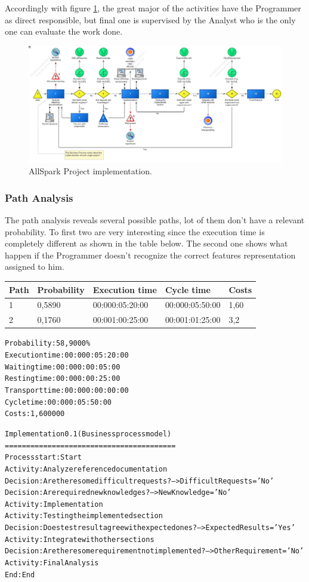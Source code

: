 Accordingly with figure \ref{2img:implementation}, the great major of the activities have the Programmer as direct responsible, but final one is supervised by the Analyst who is the only one can evaluate the work done.

\begin{figure}[ht!]
\begin{centering}
\includegraphics[scale=0.35, angle=90]{assign2/adonis/imgs/implementation.jpg}
\caption{AllSpark Project implementation.}
\label{2img:implementation}
\end{centering}
\end{figure}


\subsubsection{Path Analysis}
The path analysis reveals several possible paths, lot of them don't have a relevant probability. To first two are very interesting since the execution time is completely different as shown in the table below. The second one shows what happen if the Programmer doesn't recognize the correct features representation assigned to him.

\begin{table}
\centering
\begin{tabular}{|l|l|l|l|l|}
Path&Probability&Execution time&Cycle time&Costs\\
\hline
1&0,5890&00:000:05:20:00&00:000:05:50:00&1,60\\
\hline
2&0,1760&00:001:00:25:00&00:001:01:25:00&3,2
\end{tabular}
\end{table}

\begin{alltt}
Probability:   58,9000\%
Execution time:  00:000:05:20:00
Waiting time:  00:000:00:05:00
Resting time:  00:000:00:25:00
Transport time:  00:000:00:00:00
Cycle time:  00:000:05:50:00
Costs:  1,600000

Implementation 0.1 (Business process model)
========================================
Process start: Start
Activity: Analyze reference documentation
Decision: Are there some difficult requests? --> DifficultRequests='No'
Decision: Are required new knowledges? --> NewKnowledge='No'
Activity: Implementation
Activity: Testing the implemented section
Decision: Does test result agree with expected ones? --> ExpectedResults='Yes'
Activity: Integrate with other sections
Decision: Are there some requirement not implemented? --> OtherRequirement='No'
Activity: Final Analysis
End: End
\end{alltt}


